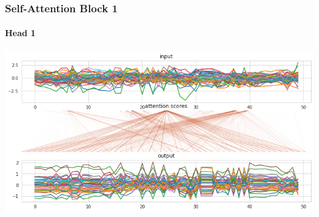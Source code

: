 %	
%	
%		
%		
%		
%		
%		
%		
%		
%		
%	

\begin{frame}
\frametitle{Self-Attention Block 1}
\framesubtitle{Head 1}
\centering\includegraphics[width=.85\textwidth]{images/self-attention/transformer/self-attention-1}
\end{frame}


